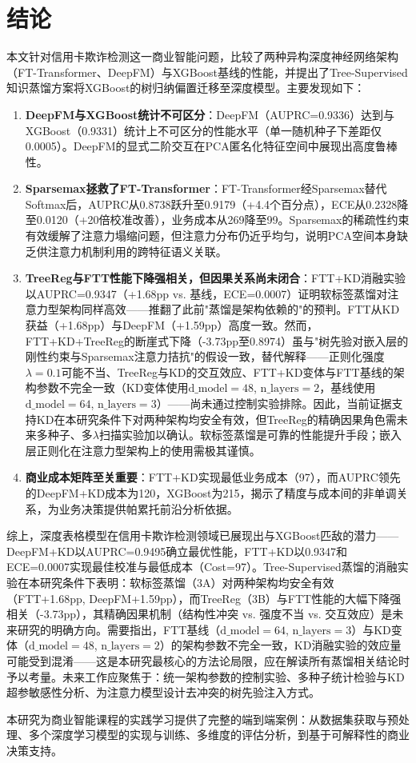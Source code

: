 
\section{结论}

本文针对信用卡欺诈检测这一商业智能问题，比较了两种异构深度神经网络架构（FT-Transformer、DeepFM）与XGBoost基线的性能，并提出了Tree-Supervised知识蒸馏方案将XGBoost的树归纳偏置迁移至深度模型。主要发现如下：

\begin{enumerate}
    \item \textbf{DeepFM与XGBoost统计不可区分}：DeepFM（AUPRC=0.9336）达到与XGBoost（0.9331）统计上不可区分的性能水平（单一随机种子下差距仅0.0005）。DeepFM的显式二阶交互在PCA匿名化特征空间中展现出高度鲁棒性。
    \item \textbf{Sparsemax拯救了FT-Transformer}：FT-Transformer经Sparsemax替代Softmax后，AUPRC从0.8738跃升至0.9179（+4.4个百分点），ECE从0.2328降至0.0120（+20倍校准改善），业务成本从269降至99。Sparsemax的稀疏性约束有效缓解了注意力塌缩问题，但注意力分布仍近乎均匀，说明PCA空间本身缺乏供注意力机制利用的跨特征语义关联。
    \item \textbf{TreeReg与FTT性能下降强相关，但因果关系尚未闭合}：FTT+KD消融实验以AUPRC=0.9347（+1.68pp vs. 基线，ECE=0.0007）证明软标签蒸馏对注意力型架构同样高效——推翻了此前"蒸馏是架构依赖的"的预判。FTT从KD获益（+1.68pp）与DeepFM（+1.59pp）高度一致。然而，FTT+KD+TreeReg的断崖式下降（-3.73pp至0.8974）虽与"树先验对嵌入层的刚性约束与Sparsemax注意力拮抗"的假设一致，替代解释——正则化强度$\lambda{=}0.1$可能不当、TreeReg与KD的交互效应、FTT+KD变体与FTT基线的架构参数不完全一致（KD变体使用$\text{d\_model}{=}48$, $\text{n\_layers}{=}2$，基线使用$\text{d\_model}{=}64$, $\text{n\_layers}{=}3$）——尚未通过控制实验排除。因此，当前证据支持KD在本研究条件下对两种架构均安全有效，但TreeReg的精确因果角色需未来多种子、多$\lambda$扫描实验加以确认。软标签蒸馏是可靠的性能提升手段；嵌入层正则化在注意力型架构上的使用需极其谨慎。
    \item \textbf{商业成本矩阵至关重要}：FTT+KD实现最低业务成本（97），而AUPRC领先的DeepFM+KD成本为120，XGBoost为215，揭示了精度与成本间的非单调关系，为业务决策提供帕累托前沿分析依据。
\end{enumerate}

综上，深度表格模型在信用卡欺诈检测领域已展现出与XGBoost匹敌的潜力——DeepFM+KD以AUPRC=0.9495确立最优性能，FTT+KD以0.9347和ECE=0.0007实现最佳校准与最低成本（Cost=97）。Tree-Supervised蒸馏的消融实验在本研究条件下表明：软标签蒸馏（3A）对两种架构均安全有效（FTT+1.68pp, DeepFM+1.59pp），而TreeReg（3B）与FTT性能的大幅下降强相关（-3.73pp），其精确因果机制（结构性冲突 vs. 强度不当 vs. 交互效应）是未来研究的明确方向。需要指出，FTT基线（$\text{d\_model}{=}64$, $\text{n\_layers}{=}3$）与KD变体（$\text{d\_model}{=}48$, $\text{n\_layers}{=}2$）的架构参数不完全一致，KD消融实验的效应量可能受到混淆——这是本研究最核心的方法论局限，应在解读所有蒸馏相关结论时予以考量。未来工作应聚焦于：统一架构参数的控制实验、多种子统计检验与KD超参敏感性分析、为注意力模型设计去冲突的树先验注入方式。

本研究为商业智能课程的实践学习提供了完整的端到端案例：从数据集获取与预处理、多个深度学习模型的实现与训练、多维度的评估分析，到基于可解释性的商业决策支持。
